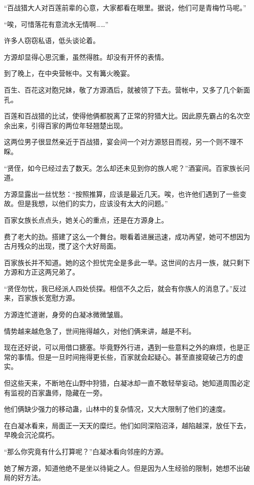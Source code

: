 \begin{this_body}
“百战猎大人对百莲前辈的心意，大家都看在眼里。据说，他们可是青梅竹马呢。”

“唉，可惜落花有意流水无情啊……”

许多人窃窃私语，低头谈论着。

方源却显得心思沉重，虽然得胜。却没有开怀的表情。

到了晚上，在中央营帐中。又有篝火晚宴。

百生、百花这对胞兄妹，敬了方源酒后，就被领了下去。营帐中，又多了几个新面孔。

百莲和百战猎的比试，使得他俩都脱离了正常的狩猎大比。因此原先霸占的名次空余出来，引得百家的两位年轻翘楚出现。

这两位男子很显然亲近于百战猎，宴会间一个对方源怒目而视，另一个则不理不睬。

“贤侄，如今已经过去了数天。怎么却还未见到你的族人呢？”酒宴间。百家族长问道。

方源显露出一丝忧愁：“按照推算，应该是最近几天。唉，也许他们遇到了一些变故。但是我想，以他们的实力，应该没有太大的问题。”

百家女族长点点头，她关心的重点，还是在方源身上。

费了老大的劲。搭建了这么一个舞台。眼看着进展迅速，成功再望，她可不想因为古月残众的出现，搅了这个大好局面。

百家族长并不知道。她的这个担忧完全是多此一举。这世间的古月一族，就只剩下方源和方正这两兄弟了。

“贤侄勿忧，我已经派人四处侦探。相信不久之后，就会有你族人的消息了。”反过来，百家族长宽慰方源。

方源连忙道谢，身旁的白凝冰微微皱眉。

情势越来越危急了，世间拖得越久，对他们俩来讲，越是不利。

现在还好说，可以用借口搪塞。毕竟野外行进，遇到一些意料之外的麻烦，也是正常的事情。但是一旦时间拖得更长些，百家就会起疑心。甚至直接窥破己方的虚实。

但这些天来，不断地在山野中狩猎，白凝冰却一直不敢轻举妄动。她知道周围必定有监视的百家蛊师，隐藏在一旁。

他们俩缺少强力的移动蛊，山林中的复杂情况，又大大限制了他们的速度。

在白凝冰看来，局面正一天天的糜烂。他们如同深陷沼泽，越陷越深，放任下去，早晚会沉沦腐朽。

“那么你究竟有什么打算呢？”白凝冰看向邻座的方源。

她了解方源，知道他绝不是坐以待毙之人。但是因为人生经验的限制，她想不出破局的好方法。


\end{this_body}
